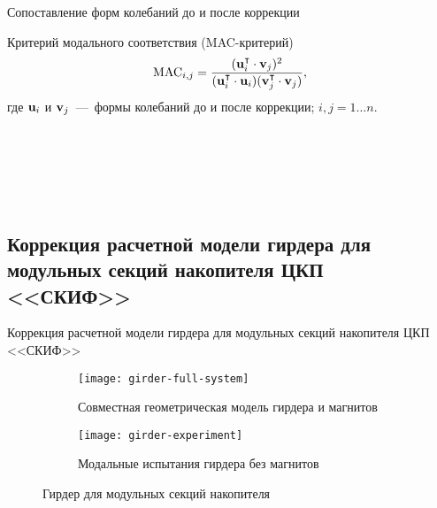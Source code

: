\begin{frame}{Сопоставление форм колебаний до и после коррекции}
	\begin{block}{Критерий модального соответствия (MAC-критерий)}
		\begin{equation}
			\mathrm{MAC}_{i, j} = \frac{(\mathbf{u}_i ^ \intercal \cdot \mathbf{v}_j) ^ 2}{(\mathbf{u}_i ^ \intercal \cdot \mathbf{u}_i) (\mathbf{v}_j ^ \intercal \cdot \mathbf{v}_j)}, 
		\end{equation}
		где $ \mathbf{u}_i $ и $ \mathbf{v}_j $~---~формы колебаний до и после коррекции; $ i, j = 1 \hdots n $.
	\end{block}
	\vspace{-2em}
	\begin{columns}
		\begin{column}{0.49\textwidth}
			\centering
			\begin{figure}
			\end{figure}
		\end{column}
		\begin{column}{0.4\textwidth}
			\centering
			\begin{figure}
				 \\ \vspace{0.2em}
				 \\ \vspace{0.2em}
				 \\ \vspace{0.2em}
			\end{figure}
		\end{column}
	\end{columns}
\end{frame}

\subsection{Коррекция расчетной модели гирдера для модульных секций накопителя ЦКП <<СКИФ>>}

\begin{frame}{Коррекция расчетной модели гирдера для модульных секций накопителя ЦКП <<СКИФ>>}
	\begin{figure}
		\begin{subfigure}[b]{0.49\textwidth}
			\centering
	     	\texttt{[image: girder-full-system]} 
	     	\caption{Совместная геометрическая модель гирдера и магнитов}
	    \end{subfigure}
    	\hfill
	    \begin{subfigure}[b]{0.49\textwidth}
			\centering
			\texttt{[image: girder-experiment]}
			\caption{Модальные испытания гирдера без магнитов}
	    \end{subfigure}
	    \caption{Гирдер для модульных секций накопителя}
	\end{figure}
\end{frame}

